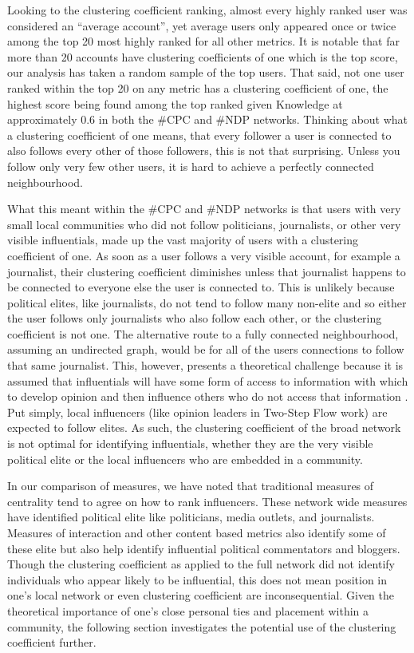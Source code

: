 \documentclass[a4paper,12pt]{article}
\begin{document}
Looking to the clustering coefficient ranking, almost every highly ranked user was considered an ``average account'', yet average users only appeared once or twice among the top 20 most highly ranked for all other metrics. It is notable that far more than 20 accounts have clustering coefficients of one which is the top score, our analysis has taken a random sample of the top users. That said, not one user ranked within the top 20 on any metric has a clustering coefficient of one, the highest score being found among the top ranked given Knowledge at approximately 0.6 in both the \#CPC and \#NDP networks. Thinking about what a clustering coefficient of one means, that every follower a user is connected to also follows every other of those followers, this is not that surprising. Unless you follow only very few other users, it is hard to achieve a perfectly connected neighbourhood. 

What this meant within the \#CPC and \#NDP networks is that users with very small local communities who did not follow politicians, journalists, or other very visible influentials, made up the vast majority of users with a clustering coefficient of one. As soon as a user follows a very visible account, for example a journalist, their clustering coefficient diminishes unless that journalist happens to be connected to everyone else the user is connected to. This is unlikely because political elites, like journalists, do not tend to follow many non-elite and so either the user follows only journalists who also follow each other, or the clustering coefficient is not one. The alternative route to a fully connected neighbourhood, assuming an undirected graph, would be for all of the users connections to follow that same journalist. This, however, presents a theoretical challenge because it is assumed that influentials will have some form of access to information with which to develop opinion and then influence others who do not access that information \cite{katzlazarsfeld}. Put simply, local influencers (like opinion leaders in Two-Step Flow work) are expected to follow elites. As such, the clustering coefficient of  the broad network is not optimal for identifying influentials, whether they are the very visible political elite or the local influencers who are embedded in a community.

In our comparison of measures, we have noted that traditional measures of centrality tend to agree on how to rank influencers. These network wide measures have identified political elite like politicians, media outlets, and journalists. Measures of interaction and other content based metrics also identify some of these elite but also help identify influential political commentators and bloggers. Though the clustering coefficient as applied to the full network did not identify individuals who appear likely to be influential, this does not mean position in one's local network or even clustering coefficient are inconsequential. Given the theoretical importance of one's close personal ties and placement within a community, the following section investigates the potential use of the clustering coefficient further.
\end{document}
